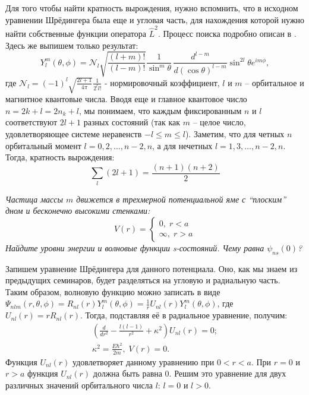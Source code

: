 Для того чтобы найти кратность вырождения, нужно вспомнить, что в исходном уравнении Шрёдингера была еще и угловая часть, для нахождения которой нужно найти собственные функции оператора $\hat{L}^2$. Процесс поиска подробно описан в . Здесь же выпишем только результат:
\[
Y^m_l(\theta, \phi) = \mathcal{N}_l\sqrt{\frac{(l+m)!}{(l-m)!}} \frac{1}{\sin^{m}\theta}\,\frac{d^{l-m}}{d(\cos\theta)^{l-m}}\sin^{2l}\theta e^{im\phi},
\]
где $\mathcal{N}_l = (-1)^l \sqrt{\frac{2l+1}{4\pi}}\frac{1}{2^l l!}$ - нормировочный коэффициент, $l$ и $m$ -- орбитальное и магнитное квантовые числа. Вводя еще и главное квантовое число $n=2k+l=2n_k+l$, мы понимаем, что каждым фиксированным $n$ и $l$ соответствуют $2l+1$ разных состояний (так как $m$ -- целое число, удовлетворяющее системе неравенств $-l\leq m\leq l$). Заметим, что для четных $n$ орбитальный момент $l = 0, 2, \dots, n-2, n$, а для нечетных $l = 1, 3, \dots, n-2, n$. Тогда, кратность вырождения:
\[
\sum_l (2l+1) = \frac{(n+1)(n+2)}{2}
\]

\begin{center}
    \textit{Частица массы $m$ движется в трехмерной потенциальной яме с ``плоским'' дном и бесконечно высокими стенками:}
    \[
    V(r)=
    \begin{cases}
        0,\; r<a\\
        \infty, \; r>a
    \end{cases}
    \]
    \textit{Найдите уровни энергии и волновые функции s-состояний. Чему равна $\psi_{ns}(0)$?}
\end{center}

Запишем уравнение Шрёдингера для данного потенциала. Оно, как мы знаем из предыдущих семинаров, будет разделяться на угловую и радиальную часть. Таким образом, волновую функцию можно записать в виде $\Psi_{nlm}(r, \theta, \phi) = R_{nl}(r)Y^{m}_l(\theta, \phi) = \frac{1}{r}U_{nl}(r)Y^{m}_l(\theta, \phi)$, где $U_{nl}(r) = rR_{nl}(r)$. Тогда, подставляя её в радиальное уравнение, получим:
\begin{gather*}
\left(\frac{d}{dr^2} - \frac{l(l-1)}{r^2} + \kappa^2\right)U_{nl}(r) = 0;\\ 
\kappa^2 = \frac{E\hbar^2}{2m},\; V(r) = 0.
\end{gather*}
Функция $U_{nl}(r)$ удовлетворяет данному уравнению при $ 0 < r < a$. При $r = 0$ и $r > a$ функция $U_{nl}(r)$ должна быть равна 0. Решим это уравнение для двух различных значений орбитального числа $l$: $l = 0$ и $l>0$.

